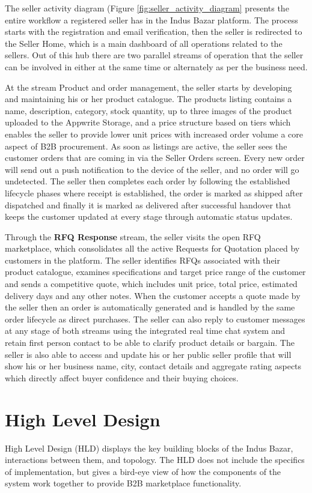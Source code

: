 The seller activity diagram (Figure \ref{fig:seller_activity_diagram} presents the entire workflow a registered seller has in the Indus Bazar platform. The process starts with the registration and email verification, then the seller is redirected to the Seller Home, which is a main dashboard of all operations related to the sellers. Out of this hub there are two parallel streams of operation that the seller can be involved in either at the same time or alternately as per the business need.

At the stream Product and order management, the seller starts by developing and maintaining his or her product catalogue. The products listing contains a name, description, category, stock quantity, up to three images of the product uploaded to the Appwrite Storage, and a price structure based on tiers which enables the seller to provide lower unit prices with increased order volume a core aspect of B2B procurement. As soon as listings are active, the seller sees the customer orders that are coming in via the Seller Orders screen. Every new order will send out a push notification to the device of the seller, and no order will go undetected. The seller then completes each order by following the established lifecycle phases where receipt is established, the order is marked as shipped after dispatched and finally it is marked as delivered after successful handover that keeps the customer updated at every stage through automatic status updates.

Through the \textbf{RFQ Response} stream, the seller visits the open RFQ marketplace, which consolidates all the active Requests for Quotation placed by customers in the platform. The seller identifies RFQs associated with their product catalogue, examines specifications and target price range of the customer and sends a competitive quote, which includes unit price, total price, estimated delivery days and any other notes. When the customer accepts a quote made by the seller then an order is automatically generated and is handled by the same order lifecycle as direct purchases. The seller can also reply to customer messages at any stage of both streams using the integrated real time chat system and retain first person contact to be able to clarify product details or bargain. The seller is also able to access and update his or her public seller profile that will show his or her business name, city, contact details and aggregate rating aspects which directly affect buyer confidence and their buying choices.

\section{High Level Design}
High Level Design (HLD) displays the key building blocks of the Indus Bazar, interactions between them, and topology. The HLD does not include the specifics of implementation, but gives a bird-eye view of how the components of the system work together to provide B2B marketplace functionality.

